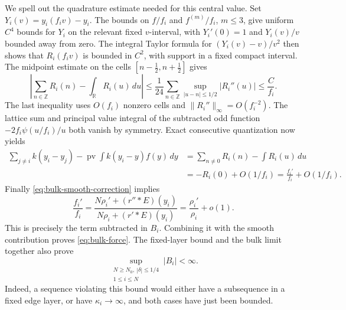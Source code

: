 We spell out the quadrature estimate needed for this central value. Set
\(Y_i(v)=y_i(f_i v)-y_i\). The bounds on \(f/f_i\) and
\(f^{(m)}/f_i\), \(m\le3\), give uniform \(C^4\) bounds for \(Y_i\) on the relevant fixed \(v\)-interval, with \(Y_i'(0)=1\) and \(Y_i(v)/v\) bounded away from zero. The integral Taylor formula for
\((Y_i(v)-v)/v^2\) then shows that \(R_i(f_i v)\) is bounded in
\(C^2\), with support in a fixed compact interval. The midpoint estimate on the cells \([n-\tfrac12,n+\tfrac12]\) gives
\[
 \left|\sum_{n\in\mathbb Z}R_i(n)-\int_{\mathbb R}R_i(u)\,du\right|
 \le\frac1{24}\sum_{n\in\mathbb Z}
       \sup_{|u-n|\le1/2}|R_i''(u)|
 \le\frac C{f_i}.
\]
The last inequality uses \(O(f_i)\) nonzero cells and
\(\|R_i''\|_\infty=O(f_i^{-2})\). The lattice sum and principal value integral of the subtracted odd function
\(-2f_i\psi(u/f_i)/u\) both vanish by symmetry. Exact consecutive quantization now yields
\[
 \begin{split}
 \sum_{j\ne i}k(y_i-y_j)
   -\operatorname{pv}\!\int k(y_i-y)f(y)\,dy
 &=\sum_{n\ne0}R_i(n)-\int R_i(u)\,du\\
 &=-R_i(0)+O(1/f_i)
 =\frac{f_i'}{f_i}+O(1/f_i).
 \end{split}
\]
Finally \eqref{eq:bulk-smooth-correction} implies
\[
 \frac{f_i'}{f_i}
 =\frac{N\rho_i'+(r''*E)(y_i)}
        {N\rho_i+(r'*E)(y_i)}
 =\frac{\rho_i'}{\rho_i}+o(1).
\]
This is precisely the term subtracted in \(B_i\). Combining it with the smooth contribution proves \eqref{eq:bulk-force}. The fixed-layer bound and the bulk limit together also prove
\begin{equation}\label{eq:uniform-force-bound}
 \sup_{\substack{N\ge N_0,\ |\delta|\le1/4\\1\le i\le N}}|B_i|<\infty.
\end{equation}
Indeed, a sequence violating this bound would either have a subsequence in a fixed edge layer, or have \(\kappa_i\to\infty\), and both cases have just been bounded.

